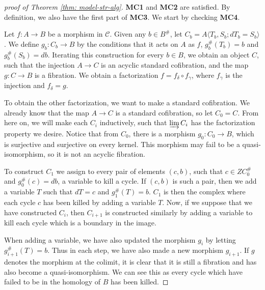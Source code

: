 \documentclass[../thesis.tex]{subfiles}
\begin{document}
            \begin{proof}[proof of Theorem \ref{thm: model-str-alg}]
                \textbf{MC1} and \textbf{MC2} are satisfied. By definition, we also have the first part of \textbf{MC3}. We start by checking \textbf{MC4}.

                Let $f:A\rightarrow B$ be a morphism in $\mathcal{C}$. Given any $b\in B^\#$, let $C_b = A\langle T_b,S_b; dT_b = S_b\rangle$. We define $g_b: C_b \rightarrow B$ by the conditions that it acts on $A$ as $f$, $g_b^\#(T_b) = b$ and $g_b^\#(S_b)=db$. Iterating this construction for every $b\in B$, we obtain an object $C$, such that the injection $A \rightarrow C$ is an acyclic standard cofibration, and the map $g: C \rightarrow B$ is a fibration. We obtain a factorization $f = f_\delta\circ f_\gamma$, where $f_\gamma$ is the injection and $f_\delta = g$.

                To obtain the other factorization, we want to make a standard cofibration. We already know that the map $A\rightarrow C$ is a standard cofibration, so let $C_0 = C$. From here on, we will make each $C_i$ inductively, such that $\varinjlim C_i$ has the factorization property we desire. Notice that from $C_0$, there is a morphism $g_0: C_0 \rightarrow B$, which is surjective and surjective on every kernel. This morphism may fail to be a quasi-isomorphism, so it is not an acyclic fibration.
                
                To construct $C_1$ we assign to every pair of elements $(c,b)$, such that $c\in ZC_0^\#$ and $g_0^\#(c) = db$, a variable to kill a cycle. If $(c,b)$ is such a pair, then we add a variable $T$ such that $dT = c$ and $g_1^\#(T)=b$. $C_1$ is then the complex where each cycle $c$ has been killed by adding a variable $T$. Now, if we suppose that we have constructed $C_i$, then $C_{i+1}$ is constructed similarly by adding a variable to kill each cycle which is a boundary in the image.

                When adding a variable, we have also updated the morphism $g_i$ by letting $g_{i+1}^\#(T) = b$. Thus in each step, we have also made a new morphism $g_{i+1}$. If $g$ denotes the morphism at the colimit, it is clear that it is still a fibration and has also become a quasi-isomorphism. We can see this as every cycle which have failed to be in the homology of $B$ has been killed. 
                

\end{proof}
\end{document}
